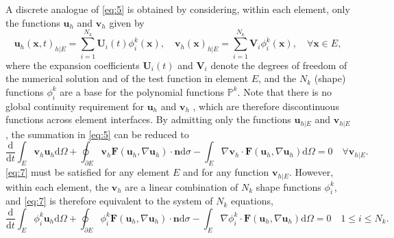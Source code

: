 \documentclass{develop-note}
\begin{document}
A discrete analogue of \autoref{eq:5} is obtained by considering, within each element, only the functions $\mathbf{u}_{h}$ and $\mathbf{v}_{h}$ given by
\begin{equation}
  \mathbf{u}_{h}(\mathbf{x},t)_{h|E}=\sum_{i=1}^{N_{k}}\mathbf{U}_{i}(t)\phi_{i}^{k}(\mathbf{x}),\quad\mathbf{v}_{h}(\mathbf{x})_{h|E}=\sum_{i=1}^{N_{k}}\mathbf{V}_{i}\phi_{i}^{k}(\mathbf{x}),\quad\forall\mathbf{x}\in E,
\end{equation}
where the expansion coefficients $\mathbf{U}_{i}(t)$ and $\mathbf{V}_{i}$ denote the degrees of freedom of the numerical solution and of the test function in element $E$, and the $N_{k}$ (shape) functions $\phi_{i}^{k}$ are a base for the polynomial functions $\mathbb{P}^{k}$. Note that there is no global continuity requirement for $\mathbf{u}_{h}$ and $\mathbf{v}_{h}$ , which are therefore discontinuous functions across element interfaces. By admitting only the functions $\mathbf{u}_{h|E}$ and $\mathbf{v}_{h|E}$, the summation in \autoref{eq:5} can be reduced to
\begin{equation}
  \label{eq:7}
  \dfrac{\mathrm{d}}{\mathrm{d}t}\int_{E}\mathbf{v}_{h}\mathbf{u}_{h}\mathrm{d}\Omega+\oint_{\partial E}\mathbf{v}_{h}\mathbf{F}(\mathbf{u}_{h},\nabla\mathbf{u}_{h})\cdot\mathbf{n}\mathrm{d}\sigma-\int_{E}\nabla\mathbf{v}_{h}\cdot\mathbf{F}(\mathbf{u}_{h},\nabla\mathbf{u}_{h})\mathrm{d}\Omega=0\quad\forall\mathbf{v}_{h|E}.
\end{equation}
\autoref{eq:7} must be satisfied for any element $E$ and for any function $\mathbf{v}_{h|E}$. However, within each element, the $\mathbf{v}_{h}$ are a linear combination of $N_{k}$ shape functions $\phi_{i}^{k}$, and \autoref{eq:7} is therefore equivalent to the system of $N_{k}$ equations,
\begin{equation}
  \label{eq:8}
  \dfrac{\mathrm{d}}{\mathrm{d}t}\int_{E}\phi_{i}^{k}\mathbf{u}_{h}\mathrm{d}\Omega+\oint_{\partial E}\phi_{i}^{k}\mathbf{F}(\mathbf{u}_{h},\nabla\mathbf{u}_{h})\cdot\mathbf{n}\mathrm{d}\sigma-\int_{E}\nabla\phi_{i}^{k}\cdot\mathbf{F}(\mathbf{u}_{h},\nabla\mathbf{u}_{h})\mathrm{d}\Omega=0\quad 1\leqslant i\leqslant N_{k}.
\end{equation}
\end{document}
